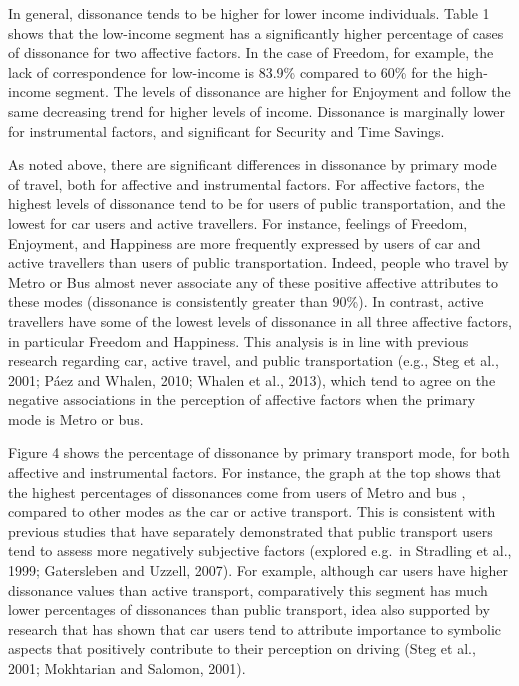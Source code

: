 \documentclass[]{elsarticle} %
\begin{document}
In general, dissonance tends to be higher for lower income individuals.
Table 1 shows that the low-income segment has a significantly higher
percentage of cases of dissonance for two affective factors. In the case
of Freedom, for example, the lack of correspondence for low-income is
83.9\% compared to 60\% for the high-income segment. The levels of
dissonance are higher for Enjoyment and follow the same decreasing trend
for higher levels of income. Dissonance is marginally lower for
instrumental factors, and significant for Security and Time Savings.

As noted above, there are significant differences in dissonance by
primary mode of travel, both for affective and instrumental factors. For
affective factors, the highest levels of dissonance tend to be for users
of public transportation, and the lowest for car users and active
travellers. For instance, feelings of Freedom, Enjoyment, and Happiness
are more frequently expressed by users of car and active travellers than
users of public transportation. Indeed, people who travel by Metro or
Bus almost never associate any of these positive affective attributes to
these modes (dissonance is consistently greater than 90\%). In contrast,
active travellers have some of the lowest levels of dissonance in all
three affective factors, in particular Freedom and Happiness. This
analysis is in line with previous research regarding car, active travel,
and public transportation (e.g., Steg et al., 2001; Páez and Whalen,
2010; Whalen et al., 2013), which tend to agree on the negative
associations in the perception of affective factors when the primary
mode is Metro or bus.

Figure 4 shows the percentage of dissonance by primary transport mode,
for both affective and instrumental factors. For instance, the graph at
the top shows that the highest percentages of dissonances come from
users of Metro and bus , compared to other modes as the car or active
transport. This is consistent with previous studies that have separately
demonstrated that public transport users tend to assess more negatively
subjective factors (explored e.g.~in Stradling et al., 1999; Gatersleben
and Uzzell, 2007). For example, although car users have higher
dissonance values than active transport, comparatively this segment has
much lower percentages of dissonances than public transport, idea also
supported by research that has shown that car users tend to attribute
importance to symbolic aspects that positively contribute to their
perception on driving (Steg et al., 2001; Mokhtarian and Salomon, 2001).
\end{document}
